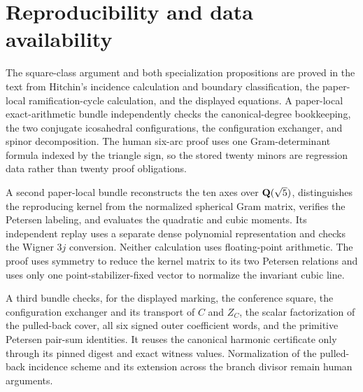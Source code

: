 \section{Reproducibility and data availability}
\label{sec:verification}

The square-class argument and both specialization propositions are proved
in the text from Hitchin's incidence calculation and boundary classification,
the paper-local ramification-cycle calculation, and the displayed equations.
A paper-local exact-arithmetic bundle independently checks the
canonical-degree bookkeeping, the two conjugate icosahedral configurations,
the configuration exchanger, and spinor
decomposition.  The
human six-arc proof uses one Gram-determinant formula indexed by the triangle
sign, so the stored twenty minors are regression data rather than twenty
proof obligations.

A second paper-local bundle reconstructs the ten axes over
\(\mathbf Q(\sqrt5)\), distinguishes the reproducing kernel from the normalized
spherical Gram matrix, verifies the Petersen labeling, and evaluates the
quadratic and cubic moments.  Its independent replay uses a separate dense
polynomial representation and checks the Wigner \(3j\) conversion.  Neither
calculation uses floating-point arithmetic.  The proof uses symmetry to
reduce the kernel matrix to its two Petersen relations and uses only one
point-stabilizer-fixed vector to normalize the invariant cubic line.

A third bundle checks, for the displayed marking, the conference square,
the configuration exchanger and its
transport of \(C\) and \(Z_C\), the scalar factorization of the pulled-back
cover, all six signed outer coefficient words, and the primitive Petersen
pair-sum identities.  It reuses the
canonical harmonic certificate only through its pinned digest and exact
witness values.  Normalization of the pulled-back incidence scheme and its
extension across the branch divisor remain human arguments.

